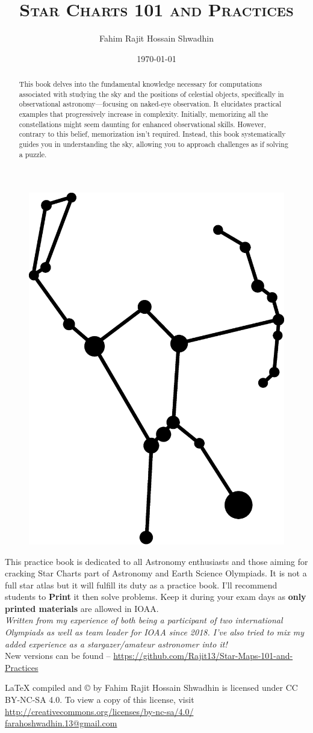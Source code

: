 \documentclass[a4paper,12pt]{extarticle}
\title{{\fontsize{30}{30}\selectfont\textbf{\textsc{Star Charts 101 and Practices}}}}
\author{Fahim Rajit Hossain Shwadhin}
\date{\today}
\begin{document}
\begin{titlepage}
	\maketitle
	
	
\begin{figure}[H]
    \centering
    \includegraphics[width=0.35 \linewidth]{ori_1.eps}
\end{figure}
	
\vspace{1cm}
This practice book is dedicated to all Astronomy enthusiasts and those aiming for cracking Star Charts part of Astronomy and Earth Science Olympiads. It is not a full star atlas but it will fulfill its duty as a practice book. I'll recommend students to \textbf{Print} it then solve problems. Keep it during your exam days as \textbf{only printed materials} are allowed in IOAA. \\

\textit{Written from my experience of both being a participant of two international Olympiads as well as team leader for IOAA since 2018. I've also tried to mix my added experience as a stargazer/amateur astronomer into it!}\\

New versions can be found -- \url{https://github.com/Rajit13/Star-Maps-101-and-Practices}

\vfill{\LaTeX  \;  compiled and  \copyright {} by \textsf{Fahim Rajit Hossain Shwadhin} is licensed under CC BY-NC-SA 4.0. To view a copy of this license, visit \url{http://creativecommons.org/licenses/by-nc-sa/4.0/} }\\

\hfill \url{farahoshwadhin.13@gmail.com}
\end{titlepage}

\tableofcontents

\clearpage
\begin{abstract}
{\color{blue} This book delves into the fundamental knowledge necessary for computations associated with studying the sky and the positions of celestial objects, specifically in observational astronomy—focusing on naked-eye observation. It elucidates practical examples that progressively increase in complexity. Initially, memorizing all the constellations might seem daunting for enhanced observational skills. However, contrary to this belief, memorization isn't required. Instead, this book systematically guides you in understanding the sky, allowing you to approach challenges as if solving a puzzle.}
\end{abstract}
\end{document}

